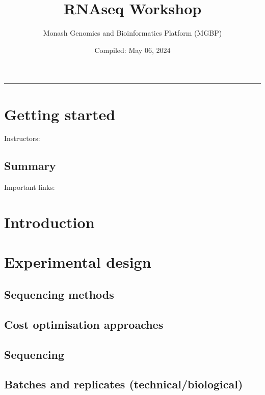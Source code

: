 \documentclass[
]{book}
\title{RNAseq Workshop}
\author{Monash Genomics and Bioinformatics Platform (MGBP)}
\date{Compiled: May 06, 2024}
\begin{document}
\maketitle

{
\setcounter{tocdepth}{1}
\tableofcontents
}
\begin{center}\rule{0.5\linewidth}{0.5pt}\end{center}

\hypertarget{getting-started}{%
\chapter{Getting started}\label{getting-started}}

Instructors:

\hypertarget{summary}{%
\section{Summary}\label{summary}}

Important links:

\hypertarget{introduction}{%
\chapter{Introduction}\label{introduction}}

\hypertarget{experimental-design}{%
\chapter{Experimental design}\label{experimental-design}}

\hypertarget{sequencing-methods}{%
\section{Sequencing methods}\label{sequencing-methods}}

\hypertarget{cost-optimisation-approaches}{%
\section{Cost optimisation approaches}\label{cost-optimisation-approaches}}

\hypertarget{sequencing}{%
\section{Sequencing}\label{sequencing}}

\hypertarget{batches-and-replicates-technicalbiological}{%
\section{Batches and replicates (technical/biological)}\label{batches-and-replicates-technicalbiological}}
\end{document}
